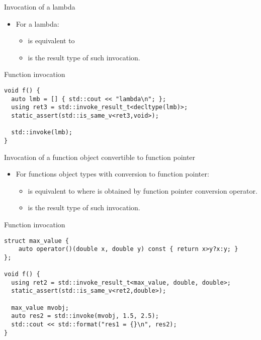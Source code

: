 \begin{frame}[t,fragile]{Invocation of a lambda}
\begin{itemize}
  \item For a lambda:
    \begin{itemize}
      \item {}
            is equivalent to 
      \item {}
            is the result type of such invocation.
    \end{itemize}
\end{itemize}
\begin{block}{Function invocation}
\begin{lstlisting}
void f() {
  auto lmb = [] { std::cout << "lambda\n"; };
  using ret3 = std::invoke_result_t<decltype(lmb)>;
  static_assert(std::is_same_v<ret3,void>);

  std::invoke(lmb);
}
\end{lstlisting}
\end{block}
\end{frame}

\begin{frame}[t,fragile]{Invocation of a function object convertible to function pointer}
\begin{itemize}
  \item For functions object types with conversion to function pointer:
    \begin{itemize}
      \item {}
            is equivalent to 
             where
             is obtained by function pointer conversion operator.
      \item {}
            is the result type of such invocation.
    \end{itemize}
\end{itemize}
\begin{block}{Function invocation}
\begin{lstlisting}[basicstyle=\mode<presentation>{\tiny}]
struct max_value {
    auto operator()(double x, double y) const { return x>y?x:y; }
};

void f() {
  using ret2 = std::invoke_result_t<max_value, double, double>;
  static_assert(std::is_same_v<ret2,double>);

  max_value mvobj;
  auto res2 = std::invoke(mvobj, 1.5, 2.5);
  std::cout << std::format("res1 = {}\n", res2);
}
\end{lstlisting}
\end{block}
\end{frame}

